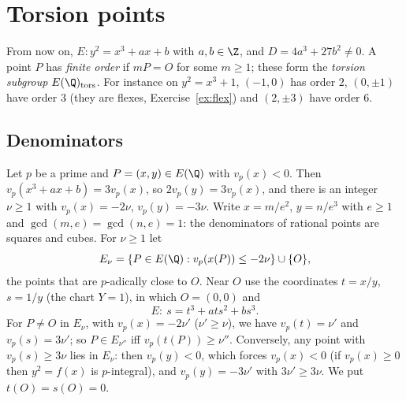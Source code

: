 \section{Torsion points}

From now on, $E:y^2=x^3+ax+b$ with $a,b\in\Z$, and $D=4a^3+27b^2\ne0$. A point $P$ has \emph{finite order} if $mP=O$ for some $m\ge1$; these form
the \emph{torsion subgroup} $E(\Q)_{\mathrm{tors}}$. For instance on $y^2=x^3+1$, $(-1,0)$ has order $2$, $(0,\pm1)$ have order $3$ (they are flexes,
Exercise~\ref{ex:flex}) and $(2,\pm3)$ have order $6$.

\subsection*{Denominators}

Let $p$ be a prime and $P=(x,y)\in E(\Q)$ with $v_p(x)<0$. Then $v_p(x^3+ax+b)=3v_p(x)$, so $2v_p(y)=3v_p(x)$, and there is an integer $\nu\ge1$ with
$v_p(x)=-2\nu$, $v_p(y)=-3\nu$. Write $x=m/e^2$, $y=n/e^3$ with $e\ge1$ and $\gcd(m,e)=\gcd(n,e)=1$: the denominators of rational points are squares and
cubes. For $\nu\ge1$ let
\[
E_\nu=\{P\in E(\Q):v_p(x(P))\le-2\nu\}\cup\{O\},
\]
the points that are $p$-adically close to $O$. Near $O$ use the coordinates $t=x/y$, $s=1/y$ (the chart $Y=1$), in which $O=(0,0)$ and
\[
E:\ s=t^3+ats^2+bs^3.
\]
For $P\ne O$ in $E_\nu$, with $v_p(x)=-2\nu'$ ($\nu'\ge\nu$), we have $v_p(t)=\nu'$ and $v_p(s)=3\nu'$; so $P\in E_{\nu''}$ iff $v_p(t(P))\ge\nu''$. Conversely,
any point with $v_p(s)\ge3\nu$ lies in $E_\nu$: then $v_p(y)<0$, which forces $v_p(x)<0$ (if $v_p(x)\ge0$ then $y^2=f(x)$ is $p$-integral), and
$v_p(y)=-3\nu'$ with $3\nu'\ge3\nu$. We put $t(O)=s(O)=0$.

